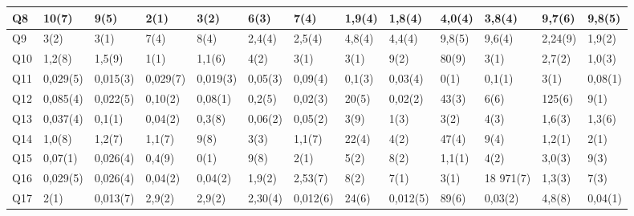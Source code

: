 \documentclass[12pt, letter paper]{report}
\begin{document}
\begin{landscape}
\begin{table}
\begin{threeparttable}
\begin{tabular}{| l | l | l | l | l | l | l | l | l | l | l | l | l |}
                Q8  & 10(7)        & 9(5)         & 2(1)\tnote{2}  & 3(2)\tnote{2}  & 6(3)\tnote{2}   & 7(4)\tnote{2}   & 1,9(4)\tnote{3}& 1,8(4)\tnote{3}& 4,0(4)\tnote{3}& 3,8(4)\tnote{3}& 9,7(6)\tnote{3} & 9,8(5)\tnote{3} \\ \hline
                Q9  & 3(2)\tnote{2}& 3(1)\tnote{2}& 7(4)\tnote{2}  & 8(4)\tnote{2}  & 2,4(4)\tnote{3} & 2,5(4)\tnote{3} & 4,8(4)\tnote{3}& 4,4(4)\tnote{3}& 9,8(5)\tnote{3}& 9,6(4)\tnote{3}& 2,24(9)\tnote{4}& 1,9(2)\tnote{4} \\ \hline
                Q10 & 1,2(8)       & 1,5(9)       & 1(1)           & 1,1(6)         & 4(2)            & 3(1)            & 3(1)\tnote{2}  & 9(2)           & 80(9)          & 3(1)\tnote{2}  & 2,7(2)\tnote{3} & 1,0(3)\tnote{3} \\ \hline
                Q11 & 0,029(5)     & 0,015(3)     & 0,029(7)       & 0,019(3)       & 0,05(3)         & 0,09(4)         & 0,1(3)         & 0,03(4)        & 0(1)           & 0,1(1)         & 3(1)\tnote{2}   & 0,08(1)         \\ \hline
                Q12 & 0,085(4)     & 0,022(5)     & 0,10(2)        & 0,08(1)        & 0,2(5)          & 0,02(3)         & 20(5)          & 0,02(2)        & 43(3)          & 6(6)           & 125(6)          & 9(1)\tnote{2}   \\ \hline
                Q13 & 0,037(4)     & 0,1(1)       & 0,04(2)        & 0,3(8)         & 0,06(2)         & 0,05(2)         & 3(9)           & 1(3)\tnote{5}  & 3(2)\tnote{2}  & 4(3)\tnote{2}  & 1,6(3)\tnote{3} & 1,3(6)\tnote{3} \\ \hline
                Q14 & 1,0(8)       & 1,2(7)       & 1,1(7)         & 9(8)           & 3(3)            & 1,1(7)          & 22(4)          & 4(2)           & 47(4)          & 9(4)           & 1,2(1)\tnote{3} & 2(1)\tnote{2}   \\ \hline
                Q15 & 0,07(1)      & 0,026(4)     & 0,4(9)         & 0(1)           & 9(8)            & 2(1)            & 5(2)\tnote{2}  & 8(2)           & 1,1(1)\tnote{3}& 4(2)\tnote{2}  & 3,0(3)\tnote{3} & 9(3)\tnote{2}   \\ \hline
                Q16 & 0,029(5)     & 0,026(4)     & 0,04(2)        & 0,04(2)        & 1,9(2)          & 2,53(7)         & 8(2)           & 7(1)           & 3(1)\tnote{2}  & 18 971(7)      & 1,3(3)\tnote{3} & 7(3)\tnote{2}   \\ \hline
                Q17 & 2(1)\tnote{2}& 0,013(7)     & 2,9(2)\tnote{3}& 2,9(2)\tnote{3}& 2,30(4)\tnote{4}& 0,012(6)        & 24(6)          & 0,012(5)       & 89(6)          & 0,03(2)        & 4,8(8)\tnote{3} & 0,04(1)         \\ \hline

\end{tabular}
\end{threeparttable}
\end{table}
\end{landscape}
\end{document}
